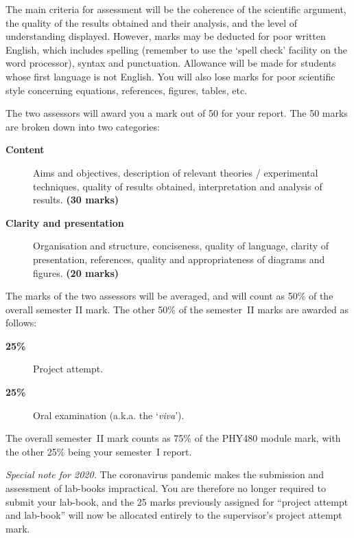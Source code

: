 \documentclass[a4paper,fleqn,usenatbib]{mnras}
\begin{document}
The main criteria for assessment will be the coherence of the scientific argument, the quality of the results obtained and their analysis, and the level of understanding displayed. However, marks may be deducted for poor written English, which  includes spelling (remember to use the `spell check' facility on the word processor), syntax and punctuation. Allowance will be made for students whose first language is not English. You will also lose marks for poor scientific style concerning equations, references, figures, tables, etc. 

The two assessors will award you a mark out of 50 for your report. The 50 marks are broken down into two categories:
\begin{description}
\item[\textbf{Content}] Aims and objectives, description of relevant theories / experimental techniques, quality of results obtained, interpretation and analysis of results.
 \textbf{(30 marks)}
\item[\textbf{Clarity and presentation}] Organisation and structure, conciseness, quality of language, clarity of presentation, references, quality and appropriateness of diagrams and figures.
 \textbf{(20 marks)}
\end{description}
The marks of the two assessors will be averaged, and will count as 50\% of the overall semester II mark. The other 50\% of the semester~II marks are awarded as follows:
\begin{description}
\item[\textbf{25\%}] Project attempt.
\item[\textbf{25\%}] Oral examination (a.k.a. the `\textit{viva}').
\end{description}
The overall semester~II mark counts as 75\% of the PHY480 module mark, with the other 25\% being your semester~I report. 

\textit{Special note for 2020.} The coronavirus pandemic makes the submission and assessment of lab-books impractical. You are therefore no longer required to submit your lab-book, and the 25 marks previously assigned for ``project attempt and lab-book'' will now be allocated entirely to the supervisor's project attempt mark.
\end{document}
